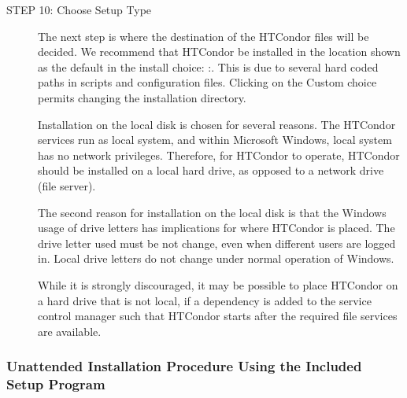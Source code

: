 \begin{description}
\item[STEP 10: Choose Setup Type]

The next step is where the destination of the HTCondor files will be
decided.
We recommend that HTCondor be installed in the location shown as the default 
in the install choice:
\verb@C:\Condor@. This is due to several hard coded
paths in scripts and configuration files.
Clicking on the Custom choice permits changing the installation directory.

Installation on the local disk is chosen for several reasons.
The HTCondor services run as local system, and within Microsoft Windows, 
local system has no network privileges.
Therefore, for HTCondor to operate, 
HTCondor should be installed on a local hard drive,
as opposed to a network drive (file server).

The second reason for installation on the local disk is that
the Windows usage of drive letters has implications for where
HTCondor is placed.
The drive letter used must be not change, even when different users are
logged in.
Local drive letters do not change under normal operation of Windows.

While it is strongly discouraged, 
it may be possible to place HTCondor on a hard drive that is not local,
if a dependency is added to the service control manager
such that HTCondor starts after the required file services
are available.


\end{description}


\subsubsection{\label{sec:nt-unattended-install-procedure}
Unattended Installation Procedure Using the Included Setup Program}

